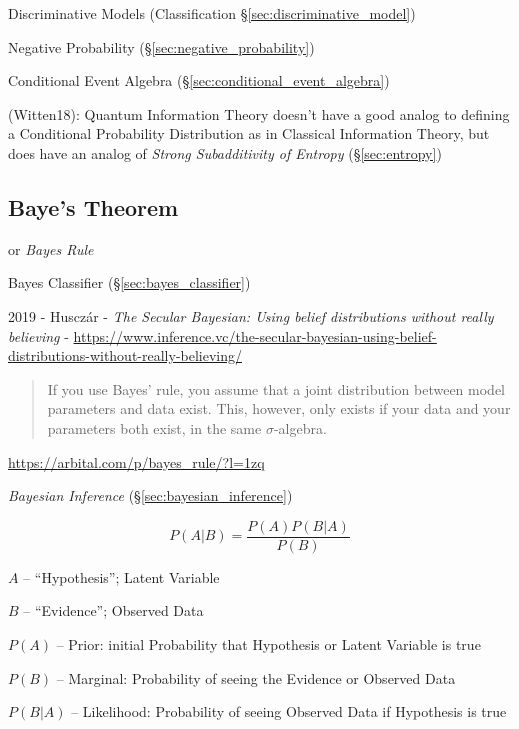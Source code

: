 \fist Discriminative Models (Classification \S\ref{sec:discriminative_model})

\fist Negative Probability (\S\ref{sec:negative_probability})

\fist Conditional Event Algebra (\S\ref{sec:conditional_event_algebra})

(Witten18): Quantum Information Theory doesn't have a good analog to defining a
Conditional Probability Distribution as in Classical Information Theory, but
does have an analog of \emph{Strong Subadditivity of Entropy}
(\S\ref{sec:entropy})



\subsection{Baye's Theorem}\label{sec:bayes_theorem}

or \emph{Bayes Rule}

\fist Bayes Classifier (\S\ref{sec:bayes_classifier})

2019 - Huscz\'ar -
\emph{The Secular Bayesian: Using belief distributions without really believing} -
\url{https://www.inference.vc/the-secular-bayesian-using-belief-distributions-without-really-believing/}

\begin{quote}
  If you use Bayes' rule, you assume that a joint distribution between model
  parameters and data exist. This, however, only exists if your data and your
  parameters both exist, in the same $\sigma$-algebra.
\end{quote}

\url{https://arbital.com/p/bayes_rule/?l=1zq}

\emph{Bayesian Inference} (\S\ref{sec:bayesian_inference})

\[
  P(A|B) = \frac{P(A)P(B|A)}{P(B)}
\]

$A$ -- ``Hypothesis''; Latent Variable

$B$ -- ``Evidence''; Observed Data

$P(A)$ -- Prior: initial Probability that Hypothesis or Latent Variable is true

$P(B)$ -- Marginal: Probability of seeing the Evidence or Observed Data

$P(B|A)$ -- Likelihood: Probability of seeing Observed Data if Hypothesis is
true

